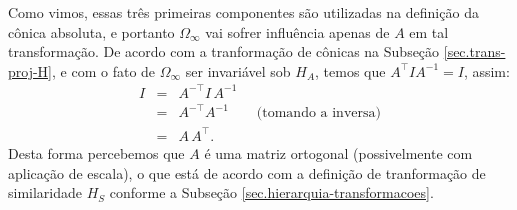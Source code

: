 Como vimos, essas três primeiras componentes são utilizadas na definição da cônica absoluta, e portanto $\Omega_\infty$ vai sofrer influência apenas de $A$ em tal transformação. 
De acordo com a tranformação de cônicas na Subseção \ref{sec.trans-proj-H}, e com o fato de $\Omega_\infty$ ser invariável sob 
$H_A$, temos que $A^\top I A^{-1}=I$, assim:
\begin{equation*}
\begin{array}{rcl}
I&=&A^{-\top}I\,A^{-1}\\
&=&A^{-\top}A^{-1}\qquad\text{(tomando a inversa)}\\
&=&A\,A^\top.
\end{array}
\end{equation*}
Desta forma percebemos que $A$ é uma matriz ortogonal (possivelmente com aplicação de escala), o que está de acordo com a definição de tranformação de similaridade $H_S$ conforme a Subseção \ref{sec.hierarquia-transformacoes}.
